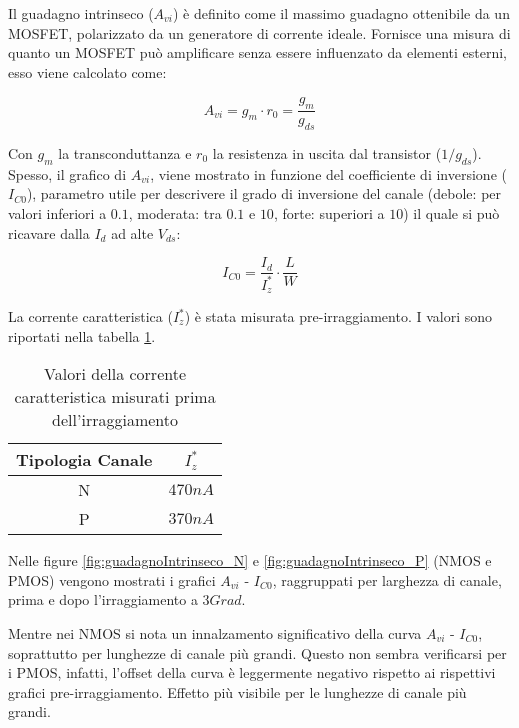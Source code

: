 Il guadagno intrinseco ($A_{vi}$) è definito come il massimo guadagno ottenibile da un MOSFET, polarizzato da un generatore di corrente ideale. Fornisce una misura di quanto un MOSFET può amplificare senza essere influenzato da elementi esterni, esso viene calcolato come:

$$A_{vi} = g_{m} \cdot r_0 = \frac{g_{m}}{g_{ds}} $$

Con $g_m$ la transconduttanza e $r_0$ la resistenza in uscita dal transistor (${1}/{g_{ds}}$). Spesso, il grafico di $A_{vi}$, viene mostrato in funzione del coefficiente di inversione ($I_{C0}$), parametro utile per descrivere il grado di inversione del canale (debole: per valori inferiori a $0.1$, moderata: tra $0.1$ e $10$, forte: superiori a $10$) il quale si può ricavare dalla $I_d$ ad alte $V_{ds}$:

$$I_{C0} = \frac{I_{d}}{I_{z}^{*}} \cdot \frac{L}{W}$$

La corrente caratteristica ($I_{z}^{*}$) è stata misurata pre-irraggiamento. I valori sono riportati nella tabella \ref{tab:corrente_caratteristica}.

\begin{table}[h!]
    \centering
    \begin{tabular}{c c}
        \toprule
        Tipologia Canale & $I_{z}^{*}$ \\
        \midrule
        N                & $470nA$     \\
        P                & $370nA$     \\
        \bottomrule
    \end{tabular}
    \caption{Valori della corrente caratteristica misurati prima dell'irraggiamento}
    \label{tab:corrente_caratteristica}
\end{table}


Nelle figure \ref{fig:guadagnoIntrinseco_N} e \ref{fig:guadagnoIntrinseco_P} (NMOS e PMOS) vengono mostrati i grafici $A_{vi}$ - $I_{C0}$, raggruppati per larghezza di canale, prima e dopo l'irraggiamento a $3Grad$.

Mentre nei NMOS si nota un innalzamento significativo della curva $A_{vi}$ - $I_{C0}$, soprattutto per lunghezze di canale più grandi. Questo non sembra verificarsi per i PMOS, infatti, l'offset della curva è leggermente negativo rispetto ai rispettivi grafici pre-irraggiamento. Effetto più visibile per le lunghezze di canale più grandi.


